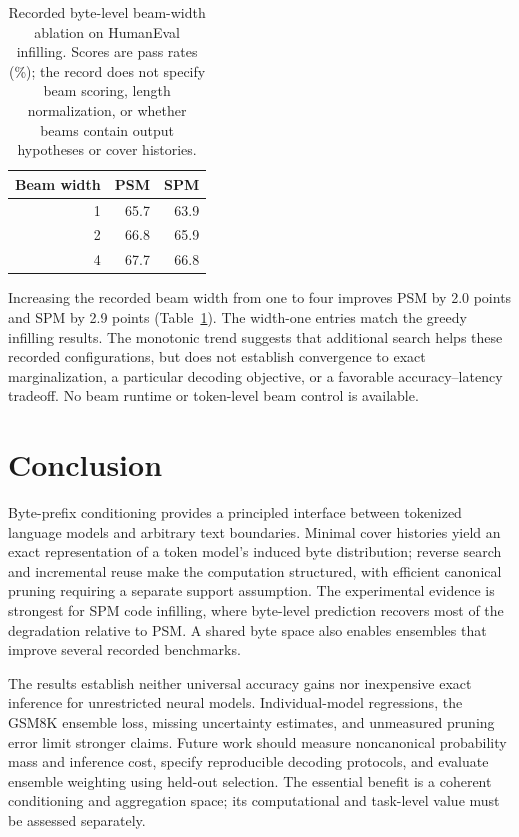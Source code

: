 \documentclass{article}
\begin{document}
\begin{table}[!htbp]
\caption{Recorded byte-level beam-width ablation on HumanEval infilling. Scores are pass rates (\%); the record does not specify beam scoring, length normalization, or whether beams contain output hypotheses or cover histories.}
\label{tab:beam}
\centering
\begin{tabular}{rrr}
\toprule
Beam width & PSM & SPM \\
\midrule
1 & 65.7 & 63.9 \\
2 & 66.8 & 65.9 \\
4 & 67.7 & 66.8 \\
\bottomrule
\end{tabular}
\end{table}

Increasing the recorded beam width from one to four improves PSM by 2.0 points and SPM by 2.9 points (Table~\ref{tab:beam}). The width-one entries match the greedy infilling results. The monotonic trend suggests that additional search helps these recorded configurations, but does not establish convergence to exact marginalization, a particular decoding objective, or a favorable accuracy--latency tradeoff. No beam runtime or token-level beam control is available.

\section{Conclusion}
\label{sec:conclusion}
Byte-prefix conditioning provides a principled interface between tokenized language models and arbitrary text boundaries. Minimal cover histories yield an exact representation of a token model's induced byte distribution; reverse search and incremental reuse make the computation structured, with efficient canonical pruning requiring a separate support assumption. The experimental evidence is strongest for SPM code infilling, where byte-level prediction recovers most of the degradation relative to PSM. A shared byte space also enables ensembles that improve several recorded benchmarks.

The results establish neither universal accuracy gains nor inexpensive exact inference for unrestricted neural models. Individual-model regressions, the GSM8K ensemble loss, missing uncertainty estimates, and unmeasured pruning error limit stronger claims. Future work should measure noncanonical probability mass and inference cost, specify reproducible decoding protocols, and evaluate ensemble weighting using held-out selection. The essential benefit is a coherent conditioning and aggregation space; its computational and task-level value must be assessed separately.
\end{document}
